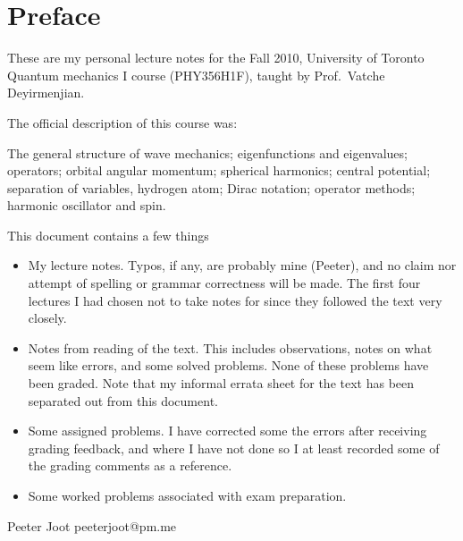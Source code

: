 %
%

%
%
\chapter*{Preface}%
These are my personal lecture notes for the Fall 2010, University of Toronto Quantum mechanics I course (PHY356H1F), taught by Prof.\ Vatche Deyirmenjian.

The official description of this course was:

The general structure of wave mechanics; eigenfunctions and eigenvalues; operators; orbital angular momentum; spherical harmonics; central potential; separation of variables, hydrogen atom; Dirac notation; operator methods; harmonic oscillator and spin.

This document contains a few things

\begin{itemize}
\item My lecture notes.
Typos, if any, are probably mine (Peeter), and no claim nor attempt of spelling or grammar correctness will be made.  The first four lectures I had chosen not to take notes for since they followed the text \citep{desai2009quantum} very closely.
\item Notes from reading of the text.  This includes observations, notes on what seem like errors, and some solved problems.  None of these problems have been graded.  Note that my informal errata sheet \citep{desaiTypos} for the text has been separated out from this document.
\item Some assigned problems.  I have corrected some the errors after receiving grading feedback, and where I have not done so I at least recorded some of the grading comments as a reference.
\item Some worked problems associated with exam preparation.
\end{itemize}

Peeter Joot  \quad peeterjoot@pm.me
